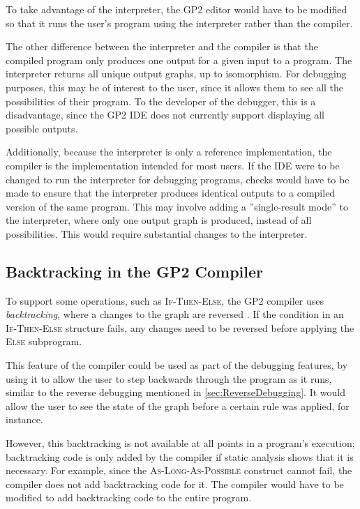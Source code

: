 \documentclass[authoryearcitations]{UoYCSproject}
\begin{document}
To take advantage of the interpreter, the GP2 editor would have to be modified
so that it runs the user's program using the interpreter rather than the compiler.

The other difference between the interpreter and the compiler is that the compiled
program only produces one output for a given input to a program. The interpreter
returns all unique output graphs, up to isomorphism. For debugging purposes, this
may be of interest to the user, since it allows them to see all the possibilities
of their program. To the developer of the debugger, this is a disadvantage, since
the GP2 IDE does not currently support displaying all possible outputs.

Additionally, because the interpreter is only a reference implementation, the
compiler is the implementation intended for most users. If the IDE were to be
changed to run the interpreter for debugging programs, checks would have to be
made to ensure that the interpreter produces identical outputs to a compiled
version of the same program. This may involve adding a ''single-result mode'' to
the interpreter, where only one output graph is produced, instead of all
possibilities. This would require substantial changes to the interpreter.


\subsection{Backtracking in the GP2 Compiler}
\label{sec:BacktrackingInTheGP2Compiler}

To support some operations, such as \textsc{If-Then-Else}, the GP2 compiler uses
\emph{backtracking}, where a changes to the graph are reversed \citep[ch. 5.8]{bak2015}.
If the condition in an \textsc{If-Then-Else} structure fails, any changes need
to be reversed before applying the \textsc{Else} subprogram.

This feature of the compiler could be used as part of the debugging features,
by using it to allow the user to step backwards through the program as it runs,
similar to the reverse debugging mentioned in \autoref{sec:ReverseDebugging}. It
would allow the user to see the state of the graph before a certain rule was
applied, for instance.

However, this backtracking is not available at all points in a program's
execution; backtracking code is only added by the compiler if static analysis
shows that it is necessary. For example, since the \textsc{As-Long-As-Possible}
construct cannot fail, the compiler does not add backtracking code for it. The
compiler would have to be modified to add backtracking code to the entire
program.
\end{document}
